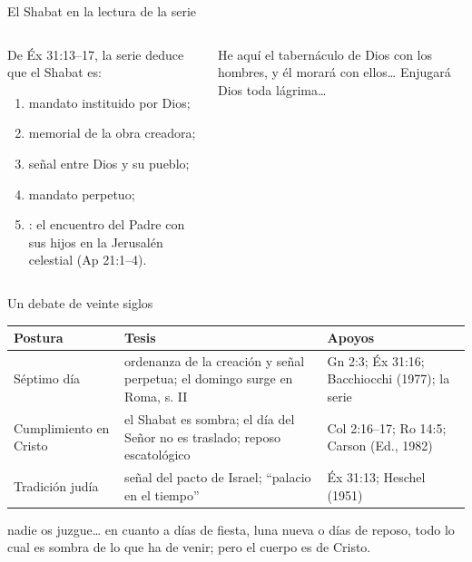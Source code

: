 \begin{frame}{El Shabat en la lectura de la serie}
\begin{columns}[c,onlytextwidth]
\begin{column}{0.50\textwidth}\small
De Éx 31:13--17, la serie deduce que el Shabat es:
\begin{enumerate}\scriptsize
\item mandato instituido por Dios;
\item memorial de la obra creadora;
\item señal entre Dios y su pueblo;
\item mandato perpetuo;
\item {}: el encuentro del Padre con sus hijos en la Jerusalén celestial (Ap 21:1--4).
\end{enumerate}
\end{column}
\begin{column}{0.48\textwidth}
\begin{cita}He aquí el tabernáculo de Dios con los hombres, y él morará con ellos\ldots{} Enjugará Dios toda lágrima\ldots{}\end{cita}
\end{column}
\end{columns}
\end{frame}

\begin{frame}{Un debate de veinte siglos}
\scriptsize\renewcommand{\arraystretch}{1.08}
\begin{tabular}{@{}L{2.3cm}L{5.2cm}L{4.3cm}@{}}
\toprule
\textbf{Postura} & \textbf{Tesis} & \textbf{Apoyos} \\ \midrule
Séptimo día & ordenanza de la creación y señal perpetua; el domingo surge en Roma, s. II & Gn 2:3; Éx 31:16; Bacchiocchi (1977); la serie \\
Cumplimiento en Cristo & el Shabat es sombra; el día del Señor no es traslado; reposo escatológico & Col 2:16--17; Ro 14:5; Carson (Ed., 1982) \\
Tradición judía & señal del pacto de Israel; ``palacio en el tiempo'' & Éx 31:13; Heschel (1951) \\
\bottomrule
\end{tabular}\par\smallskip
\begin{cita}nadie os juzgue\ldots{} en cuanto a días de fiesta, luna nueva o días de reposo, todo lo cual es sombra de lo que ha de venir; pero el cuerpo es de Cristo.\end{cita}
\vspace{-4pt}
\end{frame}

